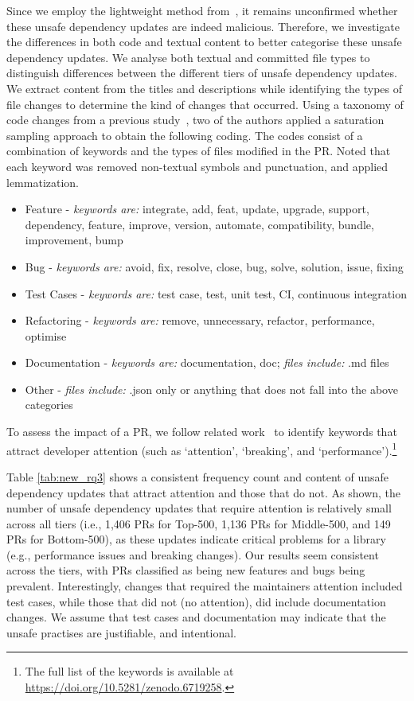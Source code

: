 \documentclass[sigconf,screen]{acmart}
\newcommand\toppkg{Top-500}
\newcommand\midpkg{Middle-500}
\newcommand\lowpkg{Bottom-500}
\begin{document}
\begin{sloppy}
Since we employ the lightweight method from~\citep{GarrettICSE-NIER19}, it remains unconfirmed whether these unsafe dependency updates are indeed malicious.
Therefore, we investigate the differences in both code and textual content to better categorise these unsafe dependency updates.
We analyse both textual and committed file types to distinguish differences between the different tiers of unsafe dependency updates. 
We extract content from the titles and descriptions while identifying the types of file changes to determine the kind of changes that occurred.
Using a taxonomy of code changes from a previous study~\citep{Subramanian:2022}, two of the authors applied a saturation sampling approach to obtain the following coding. The codes consist of a combination of keywords and the types of files modified in the PR.
Noted that each keyword was removed non-textual symbols and punctuation, and applied lemmatization.
 \begin{itemize}
     \item Feature - \textit{keywords are: } integrate, add, feat, update, upgrade, support, dependency, feature, improve, version, automate, compatibility, bundle, improvement, bump
     \item Bug - \textit{keywords are: } avoid, fix, resolve, close, bug, solve, solution, issue, fixing
      \item Test Cases - \textit{keywords are: } test case, test, unit test, CI, continuous integration
      \item Refactoring - \textit{keywords are: } remove, unnecessary, refactor, performance, optimise
      \item Documentation - \textit{keywords are: } documentation, doc; \textit{files include: } .md files
      \item Other - \textit{files include: } .json only or anything that does not fall into the above categories
 \end{itemize}

To assess the impact of a PR, we follow related work~\citep{aom:emse2023} to identify keywords that attract developer attention (such as `attention', `breaking', and `performance').\footnote{The full list of the keywords is available at \url{https://doi.org/10.5281/zenodo.6719258}.}


Table \ref{tab:new_rq3} shows a consistent frequency count and content of unsafe dependency updates that attract attention and those that do not.
As shown, the number of unsafe dependency updates that require attention is relatively small across all tiers (i.e., 1,406 PRs for \toppkg, 1,136 PRs for \midpkg, and 149 PRs for \lowpkg), as these updates indicate critical problems for a library (e.g., performance issues and breaking changes).
Our results seem consistent across the tiers, with PRs classified as being new features and bugs being prevalent.
Interestingly, changes that required the maintainers attention included test cases, while those that did not (no attention), did include documentation changes.
We assume that test cases and documentation may indicate that the unsafe practises are justifiable, and intentional.


\end{sloppy}
\end{document}
